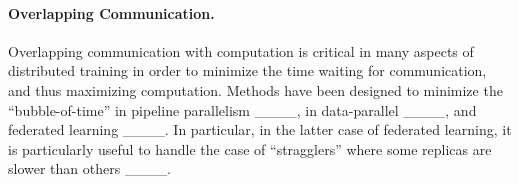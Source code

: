\paragraph{Overlapping Communication.} Overlapping communication with computation is critical in many aspects of distributed training in order to minimize the time waiting for communication, and thus maximizing computation. Methods have been designed to minimize the ``bubble-of-time'' in pipeline parallelism ____, in data-parallel ____, and federated learning ____. In particular, in the latter case of federated learning, it is particularly useful to handle the case of ``stragglers'' where some replicas are slower than others ____.